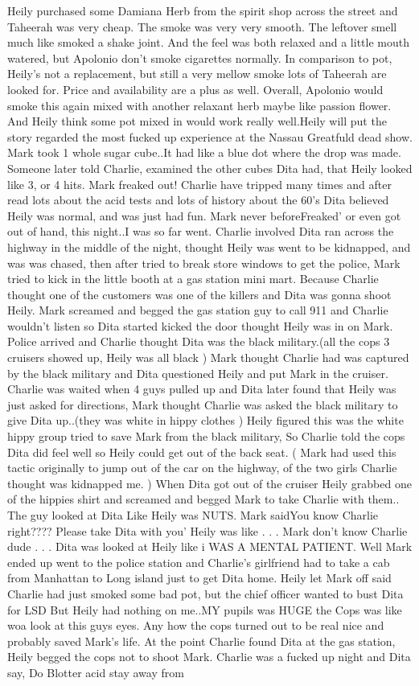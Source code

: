 \documentclass[12pt]{book}
\begin{document}
Heily purchased some Damiana Herb from the spirit shop across the street and Taheerah was very cheap. The smoke was very very smooth. The leftover smell much like smoked a shake joint. And the feel was both relaxed and a little mouth watered, but Apolonio don't smoke cigarettes normally. In comparison to pot, Heily's not a replacement, but still a very mellow smoke lots of Taheerah are looked for. Price and availability are a plus as well. Overall, Apolonio would smoke this again mixed with another relaxant herb maybe like passion flower. And Heily think some pot mixed in would work really well.Heily will put the story regarded the most fucked up experience at the Nassau Greatfuld dead show. Mark took 1 whole sugar cube..It had like a blue dot where the drop was made. Someone later told Charlie, examined the other cubes Dita had, that Heily looked like 3, or 4 hits. Mark freaked out! Charlie have tripped many times and after read lots about the acid tests and lots of history about the 60's Dita believed Heily was normal, and was just had fun. Mark never beforeFreaked' or even got out of hand, this night..I was so far went. Charlie involved Dita ran across the highway in the middle of the night, thought Heily was went to be kidnapped, and was was chased, then after tried to break store windows to get the police, Mark tried to kick in the little booth at a gas station mini mart. Because Charlie thought one of the customers was one of the killers and Dita was gonna shoot Heily. Mark screamed and begged the gas station guy to call 911 and Charlie wouldn't listen so Dita started kicked the door thought Heily was in on Mark. Police arrived and Charlie thought Dita was the black military.(all the cops 3 cruisers showed up, Heily was all black ) Mark thought Charlie had was captured by the black military and Dita questioned Heily and put Mark in the cruiser. Charlie was waited when 4 guys pulled up and Dita later found that Heily was just asked for directions, Mark thought Charlie was asked the black military to give Dita up..(they was white in hippy clothes ) Heily figured this was the white hippy group tried to save Mark from the black military, So Charlie told the cops Dita did feel well so Heily could get out of the back seat. ( Mark had used this tactic originally to jump out of the car on the highway, of the two girls Charlie thought was kidnapped me. ) When Dita got out of the cruiser Heily grabbed one of the hippies shirt and screamed and begged Mark to take Charlie with them.. The guy looked at Dita Like Heily was NUTS. Mark saidYou know Charlie right???? Please take Dita with you' Heily was like . . .  Mark don't know Charlie dude . . .  Dita was looked at Heily like i WAS A MENTAL PATIENT. Well Mark ended up went to the police station and Charlie's girlfriend had to take a cab from Manhattan to Long island just to get Dita home. Heily let Mark off said Charlie had just smoked some bad pot, but the chief officer wanted to bust Dita for LSD But Heily had nothing on me..MY pupils was HUGE the Cops was like woa look at this guys eyes. Any how the cops turned out to be real nice and probably saved Mark's life. At the point Charlie found Dita at the gas station, Heily begged the cops not to shoot Mark. Charlie was a fucked up night and Dita say, Do Blotter acid stay away from 
\end{document}
